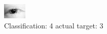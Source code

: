 \begin{figure}[h!]
\begin{center}
\includegraphics[width=0.60\columnwidth]{figures/ID56_class_4_target_3.png}
\end{center}
\caption{ Classification: 4 actual target: 3}
\label{fig:ID56_class_4_target_3}
\end{figure}
